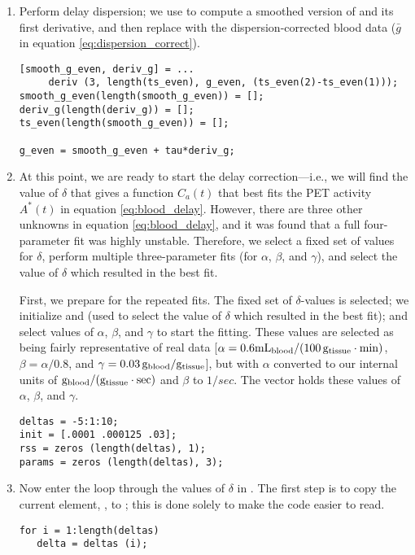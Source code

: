 \begin{enumerate}
\item Perform delay dispersion; we use  to compute a
  smoothed version of  and its first derivative, and
  then replace  with the dispersion-corrected
  blood data ($\bar g$ in equation \ref{eq:dispersion_correct}).
\begin{verbatim}
[smooth_g_even, deriv_g] = ...
     deriv (3, length(ts_even), g_even, (ts_even(2)-ts_even(1)));
smooth_g_even(length(smooth_g_even)) = [];
deriv_g(length(deriv_g)) = [];
ts_even(length(smooth_g_even)) = [];
 
g_even = smooth_g_even + tau*deriv_g;
\end{verbatim}

\item At this point, we are ready to start the delay
  correction---i.e., we will find the value of $\delta$ that gives a
  function $C_a (t)$ that best fits the PET activity $A^{*}(t)$ in
  equation \ref{eq:blood_delay}.  However, there are three other
  unknowns in equation \ref{eq:blood_delay}, and it was found that a
  full four-parameter fit was highly unstable.  Therefore, we select a
  fixed set of values for $\delta$, perform multiple three-parameter
  fits (for $\alpha$, $\beta$, and $\gamma$), and select the value of
  $\delta$ which resulted in the best fit.

  First, we prepare for the repeated fits.  The fixed set of
  $\delta$-values is selected; we initialize  and
   (used to select the value of $\delta$ which resulted in
  the best fit); and select values of $\alpha$, $\beta$, and $\gamma$
  to start the fitting.  These values are selected as being fairly
  representative of real data 
  [$\alpha = 0.6 {\rm mL_{blood} / (100 \, g_{tissue} \cdot min)}$, 
   $\beta = \alpha / 0.8$, and $\gamma = 0.03 \, {\rm g_{blood}/g_{tissue}}$],
  but with $\alpha$ converted to our internal units of 
  ${\rm g_{blood} / (g_{tissue} \cdot sec)}$ and $\beta$ to $1/sec$.
  The  vector holds these values of $\alpha$, $\beta$, and 
  $\gamma$.
\begin{verbatim}
deltas = -5:1:10;
init = [.0001 .000125 .03];
rss = zeros (length(deltas), 1);
params = zeros (length(deltas), 3);
\end{verbatim}

\item Now enter the loop through the values of $\delta$ in
  .  The first step is to copy the current element,
  , to ; this is done solely to make the
  code easier to read.
  \begin{verbatim}
for i = 1:length(deltas)
   delta = deltas (i);
  \end{verbatim}


\end{enumerate}
